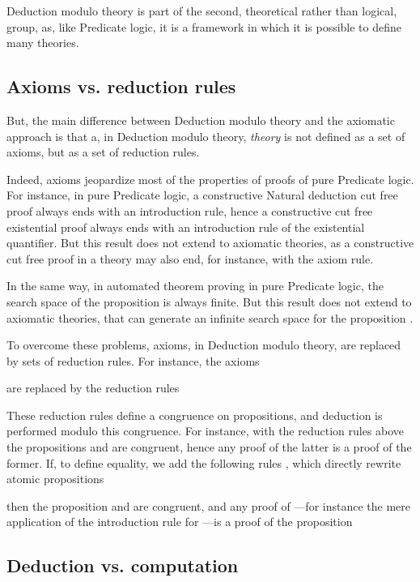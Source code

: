 \documentclass{llncs}
\begin{document}
Deduction modulo theory is part of the second, theoretical rather than
logical, group, as, like Predicate logic, it is a framework in which 
it is possible to define many theories.

\subsection{Axioms vs. reduction rules}

But, the main difference between Deduction modulo theory and the axiomatic
approach is that a, in Deduction modulo theory, {\em theory} 
is not defined as a set of axioms, but as a set of reduction rules.

Indeed, axioms jeopardize most of the properties of proofs of pure
Predicate logic.  For instance, in pure Predicate logic, a constructive
Natural deduction 
cut free proof always ends with an introduction rule, hence a
constructive cut free existential proof always ends with an introduction rule
of the existential quantifier. But this result does not extend to
axiomatic theories, as a constructive cut free proof in a theory may also
end, for instance, with the axiom rule.

In the same way, in automated theorem proving in pure Predicate logic, 
the search space of the proposition  is always finite. But this result
does not extend to axiomatic theories, that can generate an infinite search 
space for the proposition .

To overcome these problems, axioms, 
in Deduction modulo theory, are replaced by sets of reduction rules. 
For instance, the axioms 


are replaced by the reduction rules 


These reduction rules define a congruence  on propositions,
and deduction is performed modulo this congruence.
For instance, with the reduction rules above the propositions 
 and  are congruent, hence any proof of the latter is a 
proof of the former.
If, to define equality, we add the following rules \cite{Allali},
which directly rewrite atomic propositions




then the proposition 
 and  are congruent, and any proof of ---for 
instance the mere application of the introduction rule for ---is 
a proof of the proposition 


\subsection{Deduction vs. computation}
\end{document}

